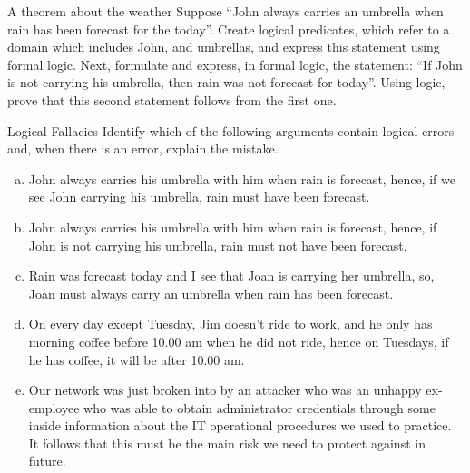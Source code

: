 \begin{exercise}{A theorem about the weather}%
Suppose ``John always carries an umbrella when rain has been forecast for the today''. Create 
logical predicates, which refer to a domain which includes John, and umbrellas,
and express this statement using formal logic.
Next, formulate and express, in formal logic, the statement: ``If John
is not carrying his umbrella, then rain was not forecast for today''.
Using logic, prove that this second statement follows from the first one.
\end{exercise}

\begin{exercise}{Logical Fallacies}
Identify which of the following arguments contain logical errors 
and, when there is an error, explain the mistake.
	\begin{enumerate}[(a)]
		\item %
John always carries his umbrella with him when rain is forecast, hence,
if we see John carrying his umbrella, rain must have been forecast.
		\item %
John always carries his umbrella with him when rain is forecast, hence,
if John is not carrying his umbrella, rain must not have been forecast.
		\item %
Rain was forecast today and I see that Joan is carrying her umbrella, so,
Joan must always carry an umbrella when rain has been forecast.
		\item %
On every day except Tuesday, Jim doesn't ride to work,
and he only has morning coffee before 10.00 am when he did not ride, 
hence on Tuesdays, if he has coffee, it will be after 10.00 am.
		\item %
Our network was just broken into by an attacker who was an unhappy ex-employee
who was able to obtain administrator credentials through some inside information
about the IT operational procedures we used to practice. It follows that
this must be the main risk we need to protect against in future.
	\end{enumerate}
\end{exercise}


